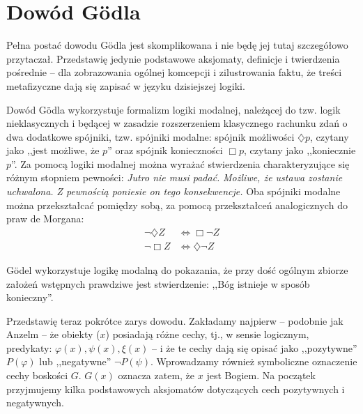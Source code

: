 \documentclass{eiti-raport}
\begin{document}
\section{Dowód G\"odla}
Pełna postać dowodu G\"odla jest skomplikowana i nie będę jej tutaj szczegółowo przytaczał. Przedstawię jedynie podstawowe aksjomaty, definicje i twierdzenia pośrednie -- dla zobrazowania ogólnej komcepcji i zilustrowania faktu, że treści metafizyczne dają się zapisać w języku dzisiejszej logiki. 

Dowód G\"odla wykorzystuje formalizm logiki modalnej, należącej do tzw. logik nieklasycznych i będącej w zasadzie rozszerzeniem klasycznego rachunku zdań o dwa dodatkowe spójniki, tzw. spójniki modalne: spójnik możliwości $\diamondsuit p$, czytany jako ,,jest możliwe, że $p$'' oraz spójnik konieczności $\Box p$, czytany jako ,,koniecznie $p$''. Za pomocą logiki modalnej można wyrażać stwierdzenia charakteryzujące się różnym stopniem pewności: \emph{Jutro nie musi padać.} \emph{Możliwe, że ustawa zostanie uchwalona.} \emph{Z pewnością poniesie on tego konsekwencje. } Oba spójniki modalne można przekształcać pomiędzy sobą, za pomocą przekształceń analogicznych do praw de Morgana:
\begin{align*}
	\neg \diamondsuit Z & \Leftrightarrow \Box \neg Z \\ 
	\neg \Box Z & \Leftrightarrow \diamondsuit \neg Z
\end{align*}

G\"odel wykorzystuje logikę modalną do pokazania, że przy dość ogólnym zbiorze założeń wstępnych prawdziwe jest stwierdzenie: ,,Bóg istnieje w sposób konieczny''. 

Przedstawię teraz pokrótce zarys dowodu. Zakładamy najpierw -- podobnie jak Anzelm -- że obiekty ($x$) posiadają różne cechy, tj., w sensie logicznym, predykaty: $\varphi(x), \psi(x), \xi(x)$ -- i że te cechy dają się opisać jako ,,pozytywne'' $P(\varphi)$ lub ,,negatywne'' $\neg P(\psi)$. Wprowadzamy również symboliczne oznaczenie cechy boskości $G$. $G(x)$ oznacza zatem, że $x$ jest Bogiem. Na początek przyjmujemy kilka podstawowych aksjomatów dotyczących cech pozytywnych i negatywnych. 

\setcounter{axiom}{0}
\setcounter{definition}{0}
\setcounter{theorem}{0}
\end{document}
